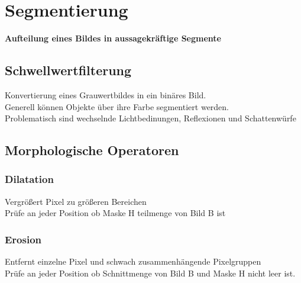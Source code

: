\section{Segmentierung}
\textbf{Aufteilung eines Bildes in aussagekräftige Segmente}
\subsection{Schwellwertfilterung}
Konvertierung eines Grauwertbildes in ein binäres Bild. \\
Generell können Objekte über ihre Farbe segmentiert werden. \\
Problematisch sind wechselnde Lichtbedinungen, Reflexionen und Schattenwürfe

\subsection{Morphologische Operatoren}
\subsubsection{Dilatation}
Vergrößert Pixel zu größeren Bereichen \\
Prüfe an jeder Position ob Maske H teilmenge von Bild B ist
\subsubsection{Erosion}
Entfernt einzelne Pixel und schwach zusammenhängende Pixelgruppen \\
Prüfe an jeder Position ob Schnittmenge von Bild B und Maske H nicht leer ist.

